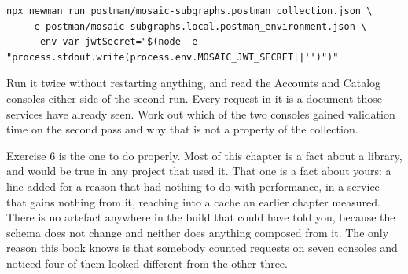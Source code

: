 \begin{enumerate}
  \begin{verbatim}
npx newman run postman/mosaic-subgraphs.postman_collection.json \
    -e postman/mosaic-subgraphs.local.postman_environment.json \
    --env-var jwtSecret="$(node -e "process.stdout.write(process.env.MOSAIC_JWT_SECRET||'')")"
  \end{verbatim}

  Run it twice without restarting anything, and read the Accounts and Catalog
  consoles either side of the second run. Every request in it is a document
  those services have already seen. Work out which of the two consoles gained
  validation time on the second pass and why that is not a property of the
  collection.
\end{enumerate}

Exercise 6 is the one to do properly. Most of this chapter is a fact about a
library, and would be true in any project that used it. That one is a fact about
yours: a line added for a reason that had nothing to do with performance, in a
service that gains nothing from it, reaching into a cache an earlier chapter
measured. There is no artefact anywhere in the build that could have told you,
because the schema does not change and neither does anything composed from it.
The only reason this book knows is that somebody counted requests on seven
consoles and noticed four of them looked different from the other three.
